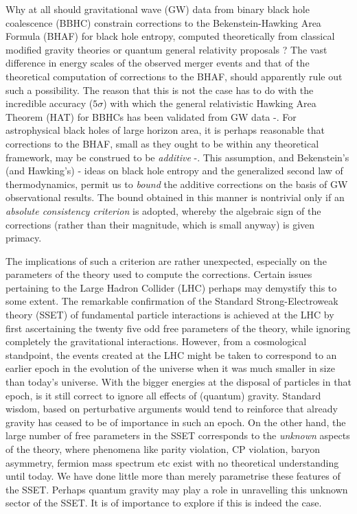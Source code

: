 \documentclass[11pt]{article}
\begin{document}
Why at all should gravitational wave (GW) data from binary black hole coalescence (BBHC) constrain corrections to the Bekenstein-Hawking Area Formula (BHAF) for black hole entropy, computed theoretically from classical modified gravity theories or quantum general relativity proposals ? The vast difference in energy scales of the observed merger events and that of the theoretical computation of corrections to the BHAF, should apparently rule out such a possibility. The reason that this is not the case has to do with the incredible accuracy ($5 \sigma$) with which the general relativistic  Hawking Area Theorem (HAT) for BBHCs has been validated from GW data \cite{teu20}-\cite{bad22}. For astrophysical black holes of large horizon area, it is perhaps reasonable that corrections to the BHAF, small as they ought to be within any theoretical framework, may be construed to be {\it additive} \cite{pm2024}-\cite{pm2026}. This assumption, and Bekenstein's (and Hawking's) \cite{bek73}-\cite{haw75} ideas on black hole entropy and the generalized second law of thermodynamics, permit us to {\it bound} the additive corrections on the basis of GW observational results. The bound obtained in this manner is nontrivial only if an {\it absolute consistency criterion} is adopted, whereby the algebraic sign of the corrections (rather than their magnitude, which is small anyway) is given primacy. 

The implications of such a criterion are rather unexpected, especially on the parameters of the theory used to compute the corrections. Certain issues pertaining to the Large Hadron Collider (LHC) perhaps may demystify this to some extent. The remarkable confirmation of the Standard Strong-Electroweak theory (SSET) of fundamental particle interactions is achieved at the LHC by first ascertaining the twenty five odd free parameters of the theory, while ignoring completely the gravitational interactions. However, from a cosmological standpoint, the events created at the LHC might be taken to correspond to an earlier epoch in the evolution of the universe when it was much smaller in size than today's universe. With the bigger energies at the disposal of particles in that epoch, is it still correct to ignore all effects of (quantum) gravity. Standard wisdom, based on perturbative arguments would tend to reinforce that already gravity has ceased to be of importance in such an epoch. On the other hand, the large number of free parameters in the SSET corresponds to the {\it unknown} aspects of the theory, where phenomena like parity violation, CP violation, baryon asymmetry, fermion mass spectrum etc exist with no theoretical understanding until today. We have done little more than merely parametrise these features of the SSET. Perhaps quantum gravity may play a role in unravelling this unknown sector of the SSET. It is of importance to explore if this is indeed the case. 
\end{document}
